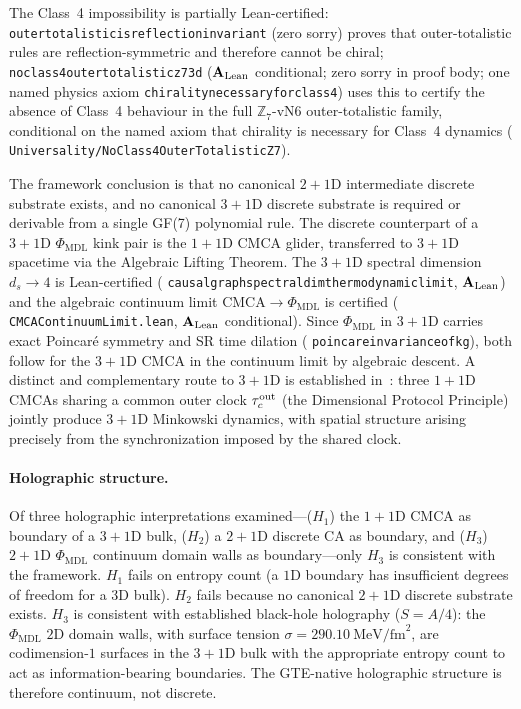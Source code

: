 \documentclass[11pt]{article}
\theoremstyle{remark}
\newcommand{\PHIMDL}{\Phi_{\mathrm{MDL}}}
\newcommand{\ZS}{\mathbb{Z}_7}
\newcommand{\lean}[1]{%
  \penalty-100
  \begingroup\def\_{\textunderscore\allowbreak}\texttt{#1}\endgroup}
\newcommand{\CatAL}{\ensuremath{\textbf{A}_{\rm Lean}}}
\begin{document}
The Class~4 impossibility is partially Lean-certified:
\lean{outer\_totalistic\_is\_reflection\_invariant} (zero sorry) proves
that outer-totalistic rules are reflection-symmetric and therefore cannot
be chiral; \lean{no\_class4\_outer\_totalistic\_z7\_3d} ($\CatAL$ conditional;
zero sorry in proof body; one named physics axiom
\lean{chirality\_necessary\_for\_class4}) uses this
to certify the absence of Class~4 behaviour in the full $\ZS$-vN6
outer-totalistic family, conditional on the named axiom that chirality
is necessary for Class~4 dynamics
(\lean{Universality/NoClass4OuterTotalisticZ7}).

The framework conclusion is that no canonical $2+1$D intermediate discrete
substrate exists, and no canonical $3+1$D discrete substrate is required
or derivable from a single GF(7) polynomial rule.  The discrete counterpart of a $3+1$D $\PHIMDL$ kink pair
is the $1+1$D CMCA glider, transferred to $3+1$D spacetime via the
Algebraic Lifting Theorem.  The $3+1$D spectral dimension $d_s\to4$ is
Lean-certified (\lean{causal\_graph\_spectral\allowbreak\_dim\_thermodynamic\_limit}, \CatAL{}) and the
algebraic continuum limit $\text{CMCA}\to\PHIMDL$ is certified
(\lean{CMCAContinuumLimit.lean}, \CatAL{} conditional).  Since $\PHIMDL$
in $3+1$D carries exact Poincar\'e symmetry and SR time dilation
(\lean{poincare\_invariance\_of\_kg}), both follow for the $3+1$D CMCA
in the continuum limit by algebraic descent.
A distinct and complementary route to $3+1$D is established
in~\cite{SpivackThreeTapeCMCA}: three $1+1$D CMCAs sharing a common outer
clock $\tau_c^{\rm out}$ (the Dimensional Protocol Principle) jointly
produce $3+1$D Minkowski dynamics, with spatial structure arising precisely
from the synchronization imposed by the shared clock.

\paragraph{Holographic structure.}
Of three holographic interpretations examined---($H_1$) the $1+1$D CMCA
as boundary of a $3+1$D bulk, ($H_2$) a $2+1$D discrete CA as boundary,
and ($H_3$) $2+1$D $\PHIMDL$ continuum domain walls as boundary---only
$H_3$ is consistent with the framework.  $H_1$ fails on entropy count
(a $1$D boundary has insufficient degrees of freedom for a $3$D bulk).
$H_2$ fails because no canonical $2+1$D discrete substrate exists.
$H_3$ is consistent with established black-hole holography ($S=A/4$):
the $\PHIMDL$ $2$D domain walls, with surface tension
$\sigma=290.10~\mathrm{MeV/fm}^2$, are codimension-$1$ surfaces in the
$3+1$D bulk with the appropriate entropy count to act as information-bearing
boundaries.  The GTE-native holographic structure is therefore continuum,
not discrete.
\end{document}
